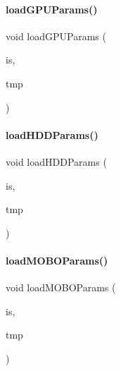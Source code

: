 \mbox{\label{_inventory_8cpp_aa795cbf45c10e4533a23961614749d05}} 
\paragraph{\texorpdfstring{loadGPUParams()}{loadGPUParams()}}
{\footnotesize\ttfamily void load\+G\+P\+U\+Params (\begin{DoxyParamCaption}\item[{std\+::istream \&}]{is,  }\item[{\mbox{\hyperlink{struct_temp_input}{Temp\+Input}} \&}]{tmp }\end{DoxyParamCaption})}

\mbox{\label{_inventory_8cpp_ab09373672ea8d4ea19f1903344fe327a}} 
\paragraph{\texorpdfstring{loadHDDParams()}{loadHDDParams()}}
{\footnotesize\ttfamily void load\+H\+D\+D\+Params (\begin{DoxyParamCaption}\item[{std\+::istream \&}]{is,  }\item[{\mbox{\hyperlink{struct_temp_input}{Temp\+Input}} \&}]{tmp }\end{DoxyParamCaption})}

\mbox{\label{_inventory_8cpp_ab92e8bf2c22b5df04897f18e888d7973}} 
\paragraph{\texorpdfstring{loadMOBOParams()}{loadMOBOParams()}}
{\footnotesize\ttfamily void load\+M\+O\+B\+O\+Params (\begin{DoxyParamCaption}\item[{std\+::istream \&}]{is,  }\item[{\mbox{\hyperlink{struct_temp_input}{Temp\+Input}} \&}]{tmp }\end{DoxyParamCaption})}

\mbox{\label{_inventory_8cpp_acecc59385cd8970fe6e368ea592362be}} 
